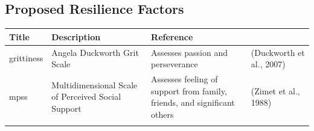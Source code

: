 \documentclass[]{book}
\begin{document}
\hypertarget{proposed-resilience-factors}{%
\subsection{Proposed Resilience Factors}\label{proposed-resilience-factors}}

\begin{longtable}[]{@{}llll@{}}
\toprule
\begin{minipage}[b]{0.22\columnwidth}\raggedright
Title\strut
\end{minipage} & \begin{minipage}[b]{0.27\columnwidth}\raggedright
Description\strut
\end{minipage} & \begin{minipage}[b]{0.22\columnwidth}\raggedright
Reference\strut
\end{minipage} & \begin{minipage}[b]{0.18\columnwidth}\raggedright
\strut
\end{minipage}\tabularnewline
\midrule
\endhead
\begin{minipage}[t]{0.22\columnwidth}\raggedright
grittiness\strut
\end{minipage} & \begin{minipage}[t]{0.27\columnwidth}\raggedright
Angela Duckworth Grit Scale\strut
\end{minipage} & \begin{minipage}[t]{0.22\columnwidth}\raggedright
Assesses passion and perseverance\strut
\end{minipage} & \begin{minipage}[t]{0.18\columnwidth}\raggedright
(Duckworth et al., 2007)\strut
\end{minipage}\tabularnewline
\begin{minipage}[t]{0.22\columnwidth}\raggedright
mpss\strut
\end{minipage} & \begin{minipage}[t]{0.27\columnwidth}\raggedright
Multidimensional Scale of Perceived Social Support\strut
\end{minipage} & \begin{minipage}[t]{0.22\columnwidth}\raggedright
Assesses feeling of support from family, friends, and significant others\strut
\end{minipage} & \begin{minipage}[t]{0.18\columnwidth}\raggedright
(Zimet et al., 1988)\strut
\end{minipage}\tabularnewline
\begin{minipage}[t]{0.22\columnwidth}\raggedright

\end{minipage}
\end{longtable}
\end{document}
